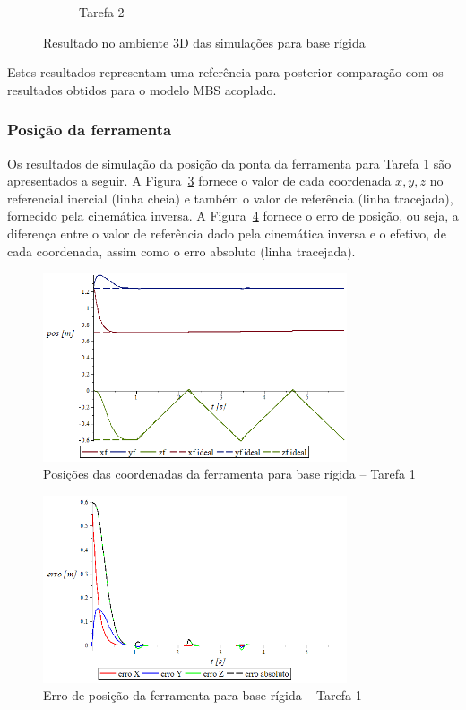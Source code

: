 \begin{figure}[h]
\begin{subfigure}[b]{0.44\textwidth}
        \caption{Tarefa 2}
        \label{fig::t2_anima3D_base_rig}
    \end{subfigure}
    \caption{Resultado no ambiente 3D das simulações para base rígida}
    \label{fig::anim3D_base_rig}
\end{figure}

Estes resultados representam uma referência para posterior comparação com os
resultados obtidos para o modelo MBS acoplado.


\subsubsection{Posição da ferramenta}

Os resultados de simulação da posição da ponta da ferramenta para Tarefa 1 são
apresentados a seguir. A Figura~\ref{fig::t1_posf_base_rig} fornece o valor de
cada coordenada $x, y, z$ no referencial inercial (linha cheia) e também o valor
de referência (linha tracejada), fornecido pela cinemática inversa. A
Figura~\ref{fig::t1_erroposf_base_rig} fornece o erro de posição, ou seja, a
diferença entre o valor de referência dado pela cinemática inversa e o efetivo,
de cada coordenada, assim como o erro absoluto (linha tracejada).

\begin{figure}[h!]
	\centering 
 	\includegraphics[width=0.80\textwidth]{figs/t1_posf_base_rig}
 	\caption{Posições das coordenadas da ferramenta para base rígida -- Tarefa 1}
 	\label{fig::t1_posf_base_rig}
\end{figure}

\begin{figure}[h!]
	\centering 
 	\includegraphics[width=0.80\textwidth]{figs/t1_erroposf_base_rig}
 	\caption{Erro de posição da ferramenta para base rígida -- Tarefa 1}
 	\label{fig::t1_erroposf_base_rig}
\end{figure}

